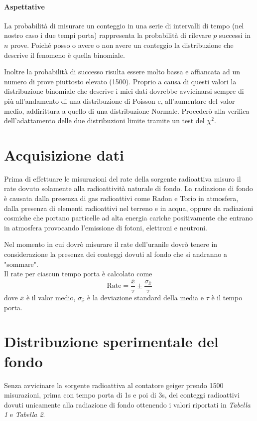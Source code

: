 \documentclass{article}
\begin{document}
\paragraph{Aspettative}
La probabilità di misurare un conteggio in una serie di intervalli di tempo (nel nostro caso i due tempi porta) rappresenta la probabilità di rilevare $p$ successi in $n$ prove. Poiché posso o avere o non avere un conteggio la distribuzione che descrive il fenomeno è quella binomiale. 

Inoltre la probabilità di successo risulta essere molto bassa e affiancata ad un numero di prove piuttosto elevato (1500). Proprio a causa di questi valori la distribuzione binomiale che descrive i miei dati dovrebbe avvicinarsi sempre di più all'andamento di una distribuzione di Poisson e, all'aumentare del valor medio, addirittura a quello di una distribuzione Normale. Procederò alla verifica dell'adattamento delle due distribuzioni limite tramite un test del $\chi^2$.

\section{Acquisizione dati}
Prima di effettuare le misurazioni del rate della sorgente radioattiva misuro il rate dovuto solamente alla radioattività naturale di fondo. La radiazione di fondo è causata dalla presenza di gas radioattivi come Radon e Torio in atmosfera, dalla presenza di elementi radioattivi nel terreno e in acqua, oppure da radiazioni cosmiche che portano  particelle ad alta energia cariche positivamente che entrano in atmosfera provocando l'emissione di fotoni, elettroni e neutroni. 

Nel momento in cui dovrò misurare il rate dell'uranile dovrò tenere in considerazione la presenza dei conteggi dovuti al fondo che si andranno a "sommare". \\

\noindent
Il rate per ciascun tempo porta è calcolato come
\[
	\text{Rate} = \frac{\bar{x}}{\tau} \pm \frac{\sigma_{\bar{x}}}{\tau}
\]
dove $\bar{x}$ è il valor medio, $\sigma_{\bar{x}}$ è la deviazione standard della media e $\tau$ è il tempo porta.

\section{Distribuzione sperimentale del fondo}
Senza avvicinare la sorgente radioattiva al contatore geiger prendo 1500 misurazioni, prima con tempo porta di 1s e poi di 3s, dei conteggi radioattivi dovuti unicamente alla radiazione di fondo ottenendo i valori riportati in \textit{Tabella 1} e \textit{Tabella 2}. 
\end{document}

